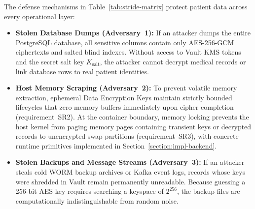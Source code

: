 The defense mechanisms in Table~\ref{tab:stride-matrix} protect patient data across every operational layer:
\begin{itemize}
    \item \textbf{Stolen Database Dumps (Adversary~1):} If an attacker dumps the entire PostgreSQL database, all sensitive columns contain only AES-256-GCM ciphertexts and salted blind indexes. Without access to Vault KMS tokens and the secret salt key $K_{\text{salt}}$, the attacker cannot decrypt medical records or link database rows to real patient identities.

    \item \textbf{Host Memory Scraping (Adversary~2):} To prevent volatile memory extraction, ephemeral Data Encryption Keys maintain strictly bounded lifecycles that zero memory buffers immediately upon cipher completion (requirement~SR2). At the container boundary, memory locking prevents the host kernel from paging memory pages containing transient keys or decrypted records to unencrypted swap partitions (requirement~SR3), with concrete runtime primitives implemented in Section~\ref{section:impl-backend}.

    \item \textbf{Stolen Backups and Message Streams (Adversary~3):} If an attacker steals cold WORM backup archives or Kafka event logs, records whose keys were shredded in Vault remain permanently unreadable. Because guessing a 256-bit AES key requires searching a keyspace of $2^{256}$, the backup files are computationally indistinguishable from random noise.
\end{itemize}
